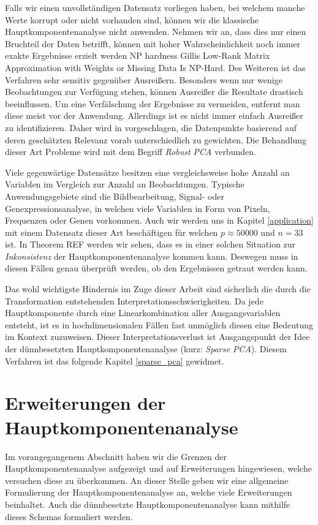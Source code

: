 Falls wir einen unvollständigen Datensatz vorliegen haben, bei welchem manche Werte korrupt oder nicht vorhanden sind, können wir die klassische Hauptkomponentenanalyse nicht anwenden. Nehmen wir an, dass dies nur einen Bruchteil der Daten betrifft, können mit hoher Wahrscheinlichkeit noch immer exakte Ergebnisse erzielt werden \cite{candes} NP hardness Gillis Low-Rank Matrix Approximation with Weights or Missing Data Is NP-Hard. Des Weiteren ist das Verfahren sehr sensitiv gegenüber Ausreißern. Besonders wenn nur wenige Beobachtungen zur Verfügung stehen, können Ausreißer die Resultate drastisch beeinflussen. Um eine Verfälschung der Ergebnisse zu vermeiden, entfernt man diese meist vor der Anwendung. Allerdings ist es nicht immer einfach Ausreißer zu identifizieren. Daher wird in \cite{kriegel} vorgeschlagen, die Datenpunkte basierend auf deren geschätzten Relevanz vorab unterschiedlich zu gewichten. Die Behandlung dieser Art Probleme wird mit dem Begriff \textit{Robust PCA} verbunden.

Viele gegenwärtige Datensätze besitzen eine vergleichsweise hohe Anzahl an Variablen im Vergleich zur Anzahl an Beobachtungen. Typische Anwendungsgebiete sind die Bildbearbeitung, Signal- oder  Genexpressionsanalyse, in welchen viele Variablen in Form von Pixeln, Frequenzen oder Genen vorkommen. Auch wir werden uns in Kapitel \ref{application} mit einem Datensatz dieser Art beschäftigen für welchen $p \approx 50000$ und $n = 33$ ist. In Theorem REF werden wir sehen, dass es in einer solchen Situation zur \textit{Inkonsistenz} der Hauptkomponentenanalyse kommen kann. Deswegen muss in diesen Fällen genau überprüft werden, ob den Ergebnissen getraut werden kann.

Das wohl wichtigste Hindernis im Zuge dieser Arbeit sind sicherlich die durch die Transformation entstehenden Interpretationsschwierigkeiten. Da jede Hauptkomponente durch eine Linearkombination aller Ausgangsvariablen entsteht, ist es in hochdimensionalen Fällen fast unmöglich diesen eine Bedeutung im Kontext zuzuweisen. Dieser Interpretationsverlust ist Ausgangspunkt der Idee der dünnbesetzten Hauptkomponentenanalyse (kurz: \textit{Sparse PCA}). Diesem Verfahren ist das folgende Kapitel \ref{sparse_pca} gewidmet.

\section{Erweiterungen der Hauptkomponentenanalyse}
\label{pca_extensions}

Im vorangegangenem Abschnitt haben wir die Grenzen der Hauptkomponentenanalyse aufgezeigt und auf Erweiterungen hingewiesen, welche versuchen diese zu überkommen. An dieser Stelle geben wir eine allgemeine Formulierung der Hauptkomponentenanalyse an, welche viele Erweiterungen beinhaltet. Auch die dünnbesetzte Hauptkomponentenanalyse kann mithilfe dieses Schemas formuliert werden.

